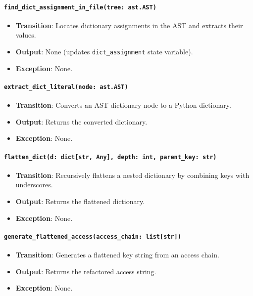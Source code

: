 \documentclass[12pt, titlepage]{article}
\begin{document}
\paragraph{\texttt{find\_dict\_assignment\_in\_file(tree: ast.AST)}}
\begin{itemize}
\item \textbf{Transition}: Locates dictionary assignments in the AST and extracts their values.
\item \textbf{Output}: None (updates \texttt{dict\_assignment} state variable).
\item \textbf{Exception}: None.
\end{itemize}

\paragraph{\texttt{extract\_dict\_literal(node: ast.AST)}}
\begin{itemize}
\item \textbf{Transition}: Converts an AST dictionary node to a Python dictionary.
\item \textbf{Output}: Returns the converted dictionary.
\item \textbf{Exception}: None.
\end{itemize}

\paragraph{\texttt{flatten\_dict(d: dict[str, Any], depth: int, parent\_key: str)}}
\begin{itemize}
\item \textbf{Transition}: Recursively flattens a nested dictionary by combining keys with underscores.
\item \textbf{Output}: Returns the flattened dictionary.
\item \textbf{Exception}: None.
\end{itemize}

\paragraph{\texttt{generate\_flattened\_access(access\_chain: list[str])}}
\begin{itemize}
\item \textbf{Transition}: Generates a flattened key string from an access chain.
\item \textbf{Output}: Returns the refactored access string.
\item \textbf{Exception}: None.
\end{itemize}
\end{document}
